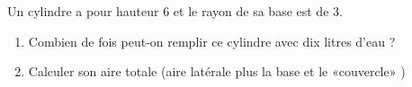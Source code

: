 
\begin{exercice}\label{exosmath-0009}

    Un cylindre a pour hauteur \unit{6}{\centi\meter} et le rayon de sa base est de \unit{3}{\centi\meter}.
    \begin{enumerate}
        \item
            Combien de fois peut-on remplir ce cylindre avec dix litres d'eau ?
        \item
            Calculer son aire totale (aire latérale plus la base et le «couvercle» )
    \end{enumerate}

\end{exercice}
